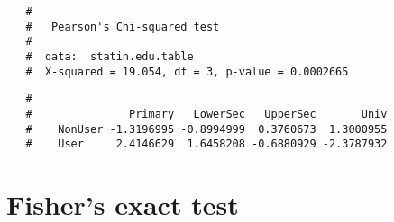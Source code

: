 \documentclass[letterpaper,12pt,twoside,]{pinp}
\begin{document}
\begin{enumerate}
\begin{Shaded}
\begin{Highlighting}[]
\OperatorTok{$}\StringTok{ }\OperatorTok{$} \OperatorTok{:}\NormalTok{,}
                             \NormalTok{(}\NormalTok{, }\NormalTok{,}
                                       \NormalTok{, }\NormalTok{))}

\StringTok{ }\OperatorTok{$}\OperatorTok{$}

\end{Highlighting}
\end{Shaded}

  \begin{ShadedResult}
   \begin{verbatim}
   #  
   #   Pearson's Chi-squared test
   #  
   #  data:  statin.edu.table
   #  X-squared = 19.054, df = 3, p-value = 0.0002665
   \end{verbatim}
   \end{ShadedResult}

\begin{Shaded}
\begin{Highlighting}[]
\OperatorTok{$}
\end{Highlighting}
\end{Shaded}

  \begin{ShadedResult}
   \begin{verbatim}
   #           
   #               Primary   LowerSec   UpperSec       Univ
   #    NonUser -1.3196995 -0.8994999  0.3760673  1.3000955
   #    User     2.4146629  1.6458208 -0.6880929 -2.3787932
   \end{verbatim}
   \end{ShadedResult}
\end{enumerate}

\newpage

\hypertarget{fishers-exact-test}{%
\section{Fisher's exact test}\label{fishers-exact-test}}
\end{document}
